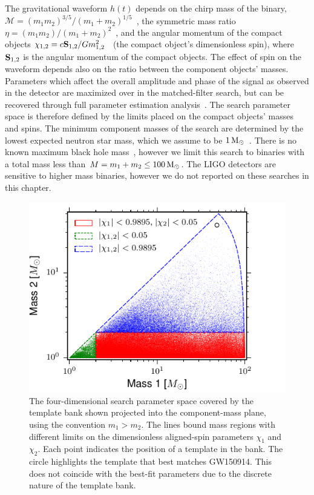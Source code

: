 The gravitational waveform $h(t)$ depends on the chirp mass of the binary,
$\mathcal{M} = (m_1 m_2)^{3/5} /
(m_1+m_2)^{1/5}$~\cite{PhysRev.131.435,Peters:1964}, the symmetric mass ratio
$\eta = (m_1 m_2) / (m_1 + m_2)^2$~\cite{Blanchet:1995ez}, and the angular
momentum of the compact objects $\chi_{1,2} = c{\bf
S}_{1,2}/Gm_{1,2}^2$~\cite{Kidder:1992fr,Kidder:1995zr} (the compact object's
dimensionless spin), where ${\bf S}_{1,2}$ is the angular momentum of the
compact objects. The effect of spin on the waveform depends also on the ratio
between the component objects' masses.  Parameters which affect the overall
amplitude and phase of the signal as observed in the detector are maximized
over in the matched-filter search, but can be recovered through full parameter
estimation analysis~\cite{GW150914-PARAMESTIM}.  The search parameter space is
therefore defined by the limits placed on the compact objects' masses and
spins.  The minimum component masses of the search are determined by the
lowest expected neutron star mass, which we assume to be
$1\,\mathrm{M}_\odot$~\cite{Miller:2014aaa}. There is no known maximum black hole
mass~\cite{Belczynski:2014iua}, however we limit this search to binaries with
a total mass less than $M = m_1 + m_2 \le 100\,\mathrm{M}_\odot$. The LIGO detectors
are sensitive to higher mass binaries, however we do not reported on these searches
in this chapter.
\begin{figure}[t]
\centering
\includegraphics[width=\textwidth]{figs/chapter2/uberbank_boundaries.pdf}
\caption{The four-dimensional search parameter space covered by the template
bank shown projected into the component-mass plane, using the convention 
$m_1 > m_2$. The lines bound mass regions with different limits on the
dimensionless aligned-spin parameters $\chi_1$ and $\chi_2$. Each point
indicates the position of a template in the bank. The circle highlights the
template that best matches GW150914. This does not coincide with the best-fit
parameters due to the discrete nature of the template bank.
\label{fig:uberbank_boundaries}}
\end{figure}


